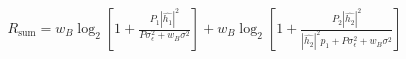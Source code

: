\documentclass[preview]{standalone}
\begin{document}
\begin{align*}
R_{\mathrm{sum}} =  w_B \log_2 \left[1 + \frac{P_1 \left|\hat{h_1}\right|^2}{P \sigma_{\epsilon}^2 + w_B \sigma^2}\right] + w_B \log_2 \left[1 + \frac{P_2 \left|\hat{h_2}\right|^2}{\left|\hat{h_2}\right|^2 p_1 + P \sigma_{\epsilon}^2 + w_B \sigma^2}\right]
\end{align*}
\end{document}
